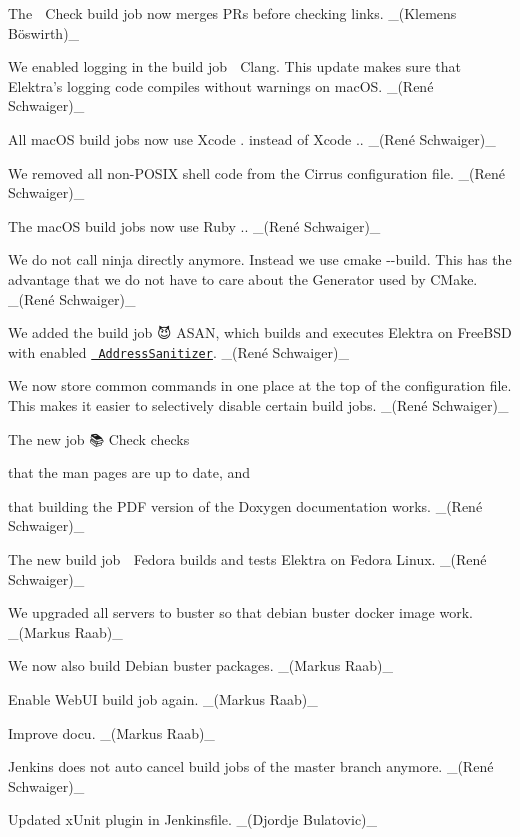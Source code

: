 \begin{DoxyItemize}
\item The {\ttfamily 🔗 Check} build job now merges P\+Rs before checking links. \+\_\+(Klemens Böswirth)\+\_\+
\item We enabled logging in the build job {\ttfamily 🍎 Clang}. This update makes sure that Elektra’s logging code compiles without warnings on mac\+OS. \+\_\+(René Schwaiger)\+\_\+
\item All mac\+OS build jobs now use Xcode {.} instead of Xcode {.}. \+\_\+(René Schwaiger)\+\_\+
\item We removed all non-\/\+P\+O\+S\+IX shell code from the Cirrus configuration file. \+\_\+(René Schwaiger)\+\_\+
\item The mac\+OS build jobs now use Ruby {.}. \+\_\+(René Schwaiger)\+\_\+
\item We do not call {\ttfamily ninja} directly anymore. Instead we use {\ttfamily cmake -\/-\/build}. This has the advantage that we do not have to care about the Generator used by C\+Make. \+\_\+(René Schwaiger)\+\_\+
\item We added the build job {\ttfamily 😈 A\+S\+AN}, which builds and executes Elektra on Free\+B\+SD with enabled \href{https://github.com/google/sanitizers/wiki/AddressSanitizer}{\texttt{ Address\+Sanitizer}}. \+\_\+(René Schwaiger)\+\_\+
\item We now store common commands in one place at the top of the configuration file. This makes it easier to selectively disable certain build jobs. \+\_\+(René Schwaiger)\+\_\+
\item The new job {\ttfamily 📚 Check} checks
\begin{DoxyItemize}
\item that the man pages are up to date, and
\item that building the P\+DF version of the Doxygen documentation works. \+\_\+(René Schwaiger)\+\_\+
\end{DoxyItemize}
\item The new build job {\ttfamily 🐧 Fedora} builds and tests Elektra on Fedora Linux. \+\_\+(René Schwaiger)\+\_\+
\end{DoxyItemize}


\begin{DoxyItemize}
\item We upgraded all servers to buster so that debian buster docker image work. \+\_\+(\+Markus Raab)\+\_\+
\item We now also build Debian buster packages. \+\_\+(\+Markus Raab)\+\_\+
\item Enable Web\+UI build job again. \+\_\+(\+Markus Raab)\+\_\+
\item Improve docu. \+\_\+(\+Markus Raab)\+\_\+
\item Jenkins does not auto cancel build jobs of the {\ttfamily master} branch anymore. \+\_\+(René Schwaiger)\+\_\+
\item Updated x\+Unit plugin in Jenkinsfile. \+\_\+(\+Djordje Bulatovic)\+\_\+
\end{DoxyItemize}


